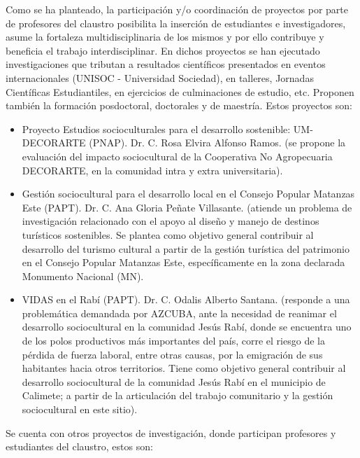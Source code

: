 Como se ha planteado, la participación y/o coordinación de proyectos por parte de profesores del claustro posibilita la inserción de estudiantes e investigadores, asume la fortaleza multidisciplinaria de los mismos y por ello contribuye y beneficia el trabajo interdisciplinar. En dichos proyectos se han ejecutado investigaciones que tributan a resultados científicos presentados en eventos internacionales (UNISOC - Universidad Sociedad), en talleres, Jornadas Científicas Estudiantiles, en ejercicios de culminaciones de estudio, etc. Proponen también la formación posdoctoral, doctorales y de maestría. Estos proyectos son:  

\begin{itemize}
	\item Proyecto Estudios socioculturales para el desarrollo sostenible: UM-DECORARTE (PNAP). Dr. C. Rosa Elvira Alfonso Ramos. (se propone la evaluación del impacto sociocultural de la Cooperativa No Agropecuaria DECORARTE, en la comunidad intra y extra universitaria).
	\item Gestión sociocultural para el desarrollo local en el Consejo Popular Matanzas Este (PAPT). Dr. C. Ana Gloria Peñate Villasante. (atiende un problema de investigación relacionado con el apoyo al diseño y manejo de destinos turísticos sostenibles. Se plantea como objetivo general contribuir al desarrollo del turismo cultural a partir de la gestión turística del patrimonio en el Consejo Popular Matanzas Este, específicamente en la zona declarada Monumento Nacional (MN).
	\item VIDAS en el Rabí (PAPT). Dr. C. Odalis Alberto Santana. (responde a una problemática demandada por AZCUBA, ante la necesidad de reanimar el desarrollo sociocultural en la comunidad Jesús Rabí, donde se encuentra uno de los polos productivos más importantes del país, corre el riesgo de la pérdida de fuerza laboral, entre otras causas, por la emigración de sus habitantes hacia otros territorios. Tiene como objetivo general contribuir al desarrollo sociocultural de la comunidad Jesús Rabí en el municipio de Calimete; a partir de la articulación del trabajo comunitario y la gestión sociocultural en este sitio).
	
\end{itemize}

Se cuenta con otros proyectos de investigación, donde participan profesores y estudiantes del claustro, estos son:

